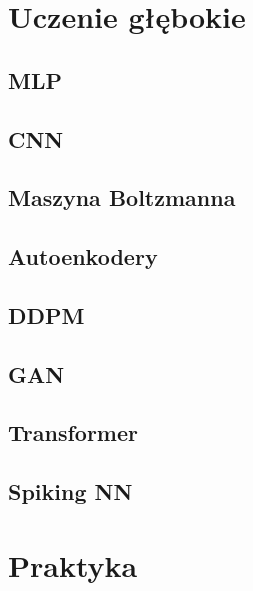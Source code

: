 \documentclass{myclass}
\author{Bartosz Hanc}
\begin{document}
\section{Uczenie głębokie}
\subsection{MLP}
\subsection{CNN}
\subsection{Maszyna Boltzmanna}
\subsection{Autoenkodery}
\subsection{DDPM}
\subsection{GAN}
\subsection{Transformer}
\subsection{Spiking NN}
%
%
%
\appendix
\section{Praktyka}
%
%
\end{document}
